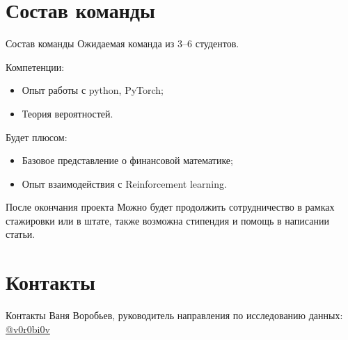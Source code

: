 \documentclass[10pt]{beamer}
\begin{document}
    \section{Состав команды}
    \begin{frame}{Состав команды}
        Ожидаемая команда из 3--6 студентов.
        
        Компетенции:
        \begin{itemize}
            \item Опыт работы с python, PyTorch;
            \item Теория вероятностей.
        \end{itemize}

        Будет плюсом:
        \begin{itemize}
            \item Базовое представление о финансовой математике;
            \item Опыт взаимодействия с Reinforcement learning.
        \end{itemize}

        \begin{block}{После окончания проекта}
            Можно будет продолжить сотрудничество в рамках стажировки или в штате, также возможна стипендия и помощь в написании статьи.
        \end{block}
    \end{frame}

    \section{Контакты}
    \begin{frame}{Контакты}
        Ваня Воробьев, руководитель направления по исследованию данных: \href{https://t.me/v0r0bi0v}{@v0r0bi0v}
    \end{frame}
\end{document}
